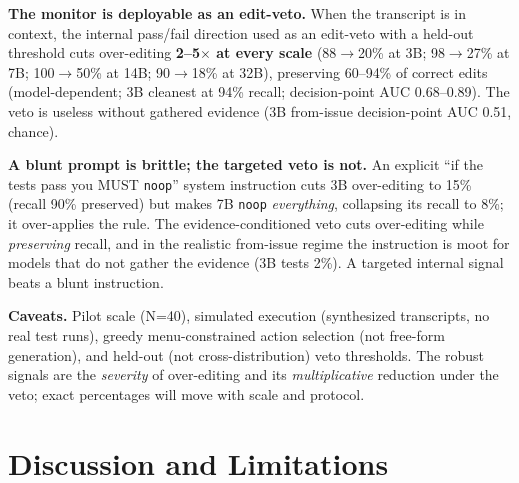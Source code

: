 \documentclass[
  11pt,
  a4paper]{article}
\begin{document}
\textbf{The monitor is deployable as an edit-veto.} When the transcript
is in context, the internal pass/fail direction used as an edit-veto
with a held-out threshold cuts over-editing \textbf{2--5\ensuremath{\times} at every
scale} (88\ensuremath{\rightarrow}20\% at 3B; 98\ensuremath{\rightarrow}27\% at 7B; 100\ensuremath{\rightarrow}50\% at 14B; 90\ensuremath{\rightarrow}18\% at 32B),
preserving 60--94\% of correct edits (model-dependent; 3B cleanest at
94\% recall; decision-point AUC 0.68--0.89). The veto is useless without
gathered evidence (3B from-issue decision-point AUC 0.51, chance).

\textbf{A blunt prompt is brittle; the targeted veto is not.} An
explicit ``if the tests pass you MUST \texttt{noop}'' system instruction
cuts 3B over-editing to 15\% (recall 90\% preserved) but makes 7B
\texttt{noop} \emph{everything}, collapsing its recall to 8\%; it
over-applies the rule. The evidence-conditioned veto cuts over-editing
while \emph{preserving} recall, and in the realistic from-issue regime
the instruction is moot for models that do not gather the evidence (3B
tests 2\%). A targeted internal signal beats a blunt instruction.

\textbf{Caveats.} Pilot scale (N=40), simulated execution (synthesized
transcripts, no real test runs), greedy menu-constrained action
selection (not free-form generation), and held-out (not
cross-distribution) veto thresholds. The robust signals are the
\emph{severity} of over-editing and its \emph{multiplicative} reduction
under the veto; exact percentages will move with scale and protocol.

\section{Discussion and Limitations}\label{discussion-and-limitations}
\end{document}
